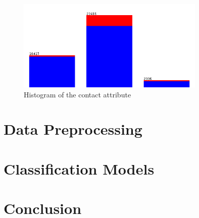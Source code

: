 \documentclass[a4paper,11pt]{article}
\begin{document}
\begin{figure}[H]
  \centering
  \includegraphics[width=0.8\textwidth]{pictures/contactHistogram.png}
  \caption{Histogram of the contact attribute}
  \label{fig:contactHistogram}
\end{figure}

\section{Data Preprocessing}

\section{Classification Models}

\section{Conclusion}
\end{document}
